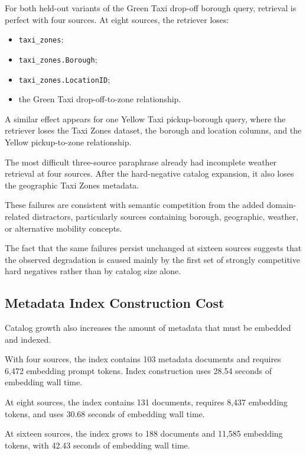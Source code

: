 For both held-out variants of the Green Taxi drop-off borough query, retrieval
is perfect with four sources. At eight sources, the retriever loses:

\begin{itemize}

    \item \texttt{taxi\_zones};
    \item \texttt{taxi\_zones.Borough};
    \item \texttt{taxi\_zones.LocationID};
    \item the Green Taxi drop-off-to-zone relationship.

\end{itemize}

A similar effect appears for one Yellow Taxi pickup-borough query, where the
retriever loses the Taxi Zones dataset, the borough and location columns, and
the Yellow pickup-to-zone relationship.

The most difficult three-source paraphrase already had incomplete weather
retrieval at four sources. After the hard-negative catalog expansion, it also
loses the geographic Taxi Zones metadata.

These failures are consistent with semantic competition from the added
domain-related distractors, particularly sources containing borough,
geographic, weather, or alternative mobility concepts.

The fact that the same failures persist unchanged at sixteen sources suggests
that the observed degradation is caused mainly by the first set of strongly
competitive hard negatives rather than by catalog size alone.


\subsection{Metadata Index Construction Cost}

Catalog growth also increases the amount of metadata that must be embedded and
indexed.

With four sources, the index contains 103 metadata documents and requires
6,472 embedding prompt tokens. Index construction uses 28.54 seconds of
embedding wall time.

At eight sources, the index contains 131 documents, requires 8,437 embedding
tokens, and uses 30.68 seconds of embedding wall time.

At sixteen sources, the index grows to 188 documents and 11,585 embedding
tokens, with 42.43 seconds of embedding wall time.

